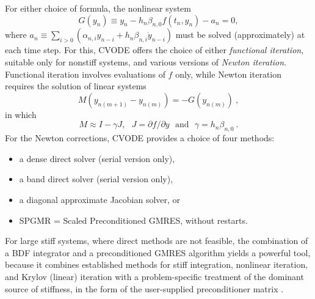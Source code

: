 For either choice of formula, the nonlinear system
\begin{equation}\label{NLS}
  G(y_n) \equiv y_n - h_n \beta_{n,0} f(t_n,y_n) - a_n = 0,
\end{equation}
where $a_n \equiv \sum_{i>0}(\alpha_{n,i} y_{n-i} + h_n \beta_{n,i} \dot{y}_{n-i})$ 
must be solved (approximately) at each time step.  For this, CVODE
offers the choice of either {\em functional iteration}, suitable only
for nonstiff systems, and various versions of {\em Newton iteration}.
Functional iteration involves evaluations of $f$ only, while Newton
iteration requires the solution of linear systems
\begin{equation}\label{Newtoncorr}
  M (y_{n(m+1)} - y_{n(m)}) = -G(y_{n(m)}) ~,
\end{equation}
in which
\begin{equation}\label{Newtonmat} 
  M \approx I - \gamma J, ~~~J = \partial f / \partial y 
  ~~~ \mbox{and} ~~~\gamma = h_n \beta_{n,0} ~. 
\end{equation}
For the Newton corrections, CVODE provides a choice of four methods:
\begin{itemize}
\item a dense direct solver (serial version only),
\item a band direct solver (serial version only),
\item a diagonal approximate Jacobian solver, or
\item SPGMR = Scaled Preconditioned GMRES, without restarts.
\end{itemize}
For large stiff systems, where direct methods are not feasible, the
combination of a BDF integrator and a preconditioned GMRES algorithm
yields a powerful tool, because it combines established methods for
stiff integration, nonlinear iteration, and Krylov (linear) iteration
with a problem-specific treatment of the dominant source of stiffness,
in the form of the user-supplied preconditioner matrix \cite{BrHi:89}.

